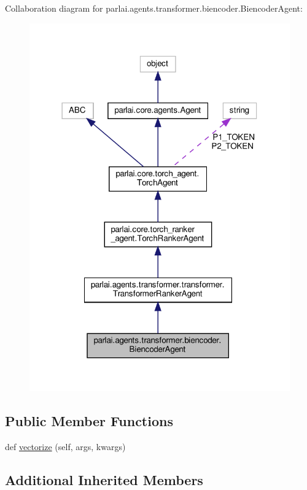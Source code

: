 Collaboration diagram for parlai.\+agents.\+transformer.\+biencoder.\+Biencoder\+Agent\+:
\nopagebreak
\begin{figure}[H]
\begin{center}
\leavevmode
\includegraphics[width=318pt]{d8/da9/classparlai_1_1agents_1_1transformer_1_1biencoder_1_1BiencoderAgent__coll__graph}
\end{center}
\end{figure}
\subsection*{Public Member Functions}
\begin{DoxyCompactItemize}
\item 
def \hyperlink{classparlai_1_1agents_1_1transformer_1_1biencoder_1_1BiencoderAgent_a0a75b68e9e6877358245f85bcb438d03}{vectorize} (self, args, kwargs)
\end{DoxyCompactItemize}
\subsection*{Additional Inherited Members}


